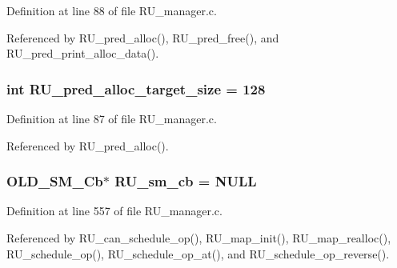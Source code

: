 Definition at line 88 of file RU\_\-manager.c.

Referenced by RU\_\-pred\_\-alloc(), RU\_\-pred\_\-free(), and RU\_\-pred\_\-print\_\-alloc\_\-data().
\subsubsection{\setlength{\rightskip}{0pt plus 5cm}int \bf{RU\_\-pred\_\-alloc\_\-target\_\-size} = 128}\label{RU__manager_8c_b3cf7ccf4896943986e5d5b41a522f41}




Definition at line 87 of file RU\_\-manager.c.

Referenced by RU\_\-pred\_\-alloc().
\subsubsection{\setlength{\rightskip}{0pt plus 5cm}\bf{OLD\_\-SM\_\-Cb}$\ast$ \bf{RU\_\-sm\_\-cb} = \bf{NULL}}\label{RU__manager_8c_280f83ab226ce658de845ba6242dab13}




Definition at line 557 of file RU\_\-manager.c.

Referenced by RU\_\-can\_\-schedule\_\-op(), RU\_\-map\_\-init(), RU\_\-map\_\-realloc(), RU\_\-schedule\_\-op(), RU\_\-schedule\_\-op\_\-at(), and RU\_\-schedule\_\-op\_\-reverse().